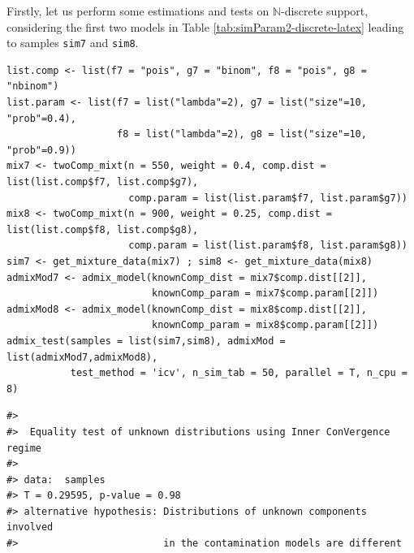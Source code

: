 \begin{table}[!h]
\centering
\caption{\label{tab:simParam2-discrete-latex}Parameters in the 2-sample case, with other support types (involving Binomial, Poisson, Negative Binomial, Uniform and Beta distributions).}
\centering
{}
\end{table}

Firstly, let us perform some estimations and tests on \(\mathbb{N}\)-discrete support, considering the first two models in Table \ref{tab:simParam2-discrete-latex} leading to samples \texttt{sim7} and \texttt{sim8}.

\begin{verbatim}
list.comp <- list(f7 = "pois", g7 = "binom", f8 = "pois", g8 = "nbinom")
list.param <- list(f7 = list("lambda"=2), g7 = list("size"=10, "prob"=0.4),
                   f8 = list("lambda"=2), g8 = list("size"=10, "prob"=0.9))
mix7 <- twoComp_mixt(n = 550, weight = 0.4, comp.dist = list(list.comp$f7, list.comp$g7),
                     comp.param = list(list.param$f7, list.param$g7))
mix8 <- twoComp_mixt(n = 900, weight = 0.25, comp.dist = list(list.comp$f8, list.comp$g8),
                     comp.param = list(list.param$f8, list.param$g8))
sim7 <- get_mixture_data(mix7) ; sim8 <- get_mixture_data(mix8)
admixMod7 <- admix_model(knownComp_dist = mix7$comp.dist[[2]],
                         knownComp_param = mix7$comp.param[[2]])
admixMod8 <- admix_model(knownComp_dist = mix8$comp.dist[[2]],
                         knownComp_param = mix8$comp.param[[2]])
admix_test(samples = list(sim7,sim8), admixMod = list(admixMod7,admixMod8),
           test_method = 'icv', n_sim_tab = 50, parallel = T, n_cpu = 8)
\end{verbatim}

\begin{verbatim}
#> 
#>  Equality test of unknown distributions using Inner ConVergence regime
#> 
#> data:  samples
#> T = 0.29595, p-value = 0.98
#> alternative hypothesis: Distributions of unknown components involved 
#>                         in the contamination models are different
\end{verbatim}

